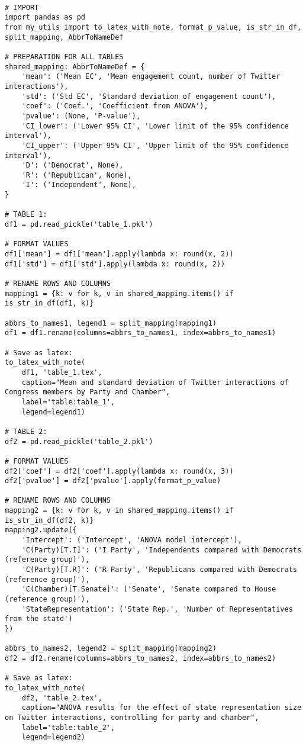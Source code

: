 \documentclass[11pt]{article}
\begin{document}
\begin{verbatim}

# IMPORT
import pandas as pd
from my_utils import to_latex_with_note, format_p_value, is_str_in_df, split_mapping, AbbrToNameDef

# PREPARATION FOR ALL TABLES
shared_mapping: AbbrToNameDef = {
    'mean': ('Mean EC', 'Mean engagement count, number of Twitter interactions'),
    'std': ('Std EC', 'Standard deviation of engagement count'),
    'coef': ('Coef.', 'Coefficient from ANOVA'),
    'pvalue': (None, 'P-value'),
    'CI_lower': ('Lower 95% CI', 'Lower limit of the 95% confidence interval'),
    'CI_upper': ('Upper 95% CI', 'Upper limit of the 95% confidence interval'),
    'D': ('Democrat', None),
    'R': ('Republican', None),
    'I': ('Independent', None),
}

# TABLE 1:
df1 = pd.read_pickle('table_1.pkl')

# FORMAT VALUES
df1['mean'] = df1['mean'].apply(lambda x: round(x, 2))
df1['std'] = df1['std'].apply(lambda x: round(x, 2))

# RENAME ROWS AND COLUMNS
mapping1 = {k: v for k, v in shared_mapping.items() if is_str_in_df(df1, k)} 

abbrs_to_names1, legend1 = split_mapping(mapping1)
df1 = df1.rename(columns=abbrs_to_names1, index=abbrs_to_names1)

# Save as latex:
to_latex_with_note(
    df1, 'table_1.tex',
    caption="Mean and standard deviation of Twitter interactions of Congress members by Party and Chamber", 
    label='table:table_1',
    legend=legend1)

# TABLE 2:
df2 = pd.read_pickle('table_2.pkl')

# FORMAT VALUES 
df2['coef'] = df2['coef'].apply(lambda x: round(x, 3))
df2['pvalue'] = df2['pvalue'].apply(format_p_value)

# RENAME ROWS AND COLUMNS
mapping2 = {k: v for k, v in shared_mapping.items() if is_str_in_df(df2, k)}
mapping2.update({
    'Intercept': ('Intercept', 'ANOVA model intercept'),
    'C(Party)[T.I]': ('I Party', 'Independents compared with Democrats (reference group)'),
    'C(Party)[T.R]': ('R Party', 'Republicans compared with Democrats (reference group)'),
    'C(Chamber)[T.Senate]': ('Senate', 'Senate compared to House (reference group)'),
    'StateRepresentation': ('State Rep.', 'Number of Representatives from the state')
})

abbrs_to_names2, legend2 = split_mapping(mapping2)
df2 = df2.rename(columns=abbrs_to_names2, index=abbrs_to_names2)

# Save as latex:
to_latex_with_note(
    df2, 'table_2.tex',
    caption="ANOVA results for the effect of state representation size on Twitter interactions, controlling for party and chamber", 
    label='table:table_2',
    legend=legend2)

\end{verbatim}
\end{document}
